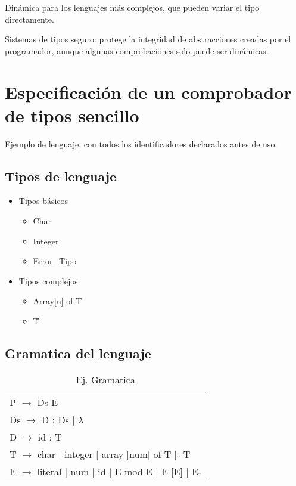 \documentclass[12pt, twoside, openright]{report} %
\begin{document}
Dinámica para los lenguajes más complejos, que pueden variar el tipo directamente.

Sistemas de tipos seguro: protege la integridad de abstracciones creadas por el programador, aunque algunas comprobaciones solo puede ser dinámicas.

\section{Especificación de un comprobador de tipos sencillo}

Ejemplo de lenguaje, con todos los identificadores declarados antes de uso.

\subsection{Tipos de lenguaje}
\begin{itemize}
	\item Tipos básicos
	      \begin{itemize}
		      \item Char
		      \item Integer
		      \item Error\_Tipo
	      \end{itemize}
	\item Tipos complejos
	      \begin{itemize}
		      \item Array[n] of T
		      \item \^ T
	      \end{itemize}
\end{itemize}

\subsection{Gramatica del lenguaje}

\begin{table}[H]
	\begin{tabular}{l}
		P $\rightarrow$ Ds E                                              \\
		Ds $\rightarrow$ D ; Ds | $\lambda$                               \\
		D $\rightarrow$ id : T                                            \\
		T $\rightarrow$ char | integer | array [num] of T | $\hat{}$ T    \\
		E $\rightarrow$ literal | num | id | E mod E | E [E] | E $\hat{}$
	\end{tabular}
	\caption{Ej. Gramatica}
\end{table}
\end{document}
